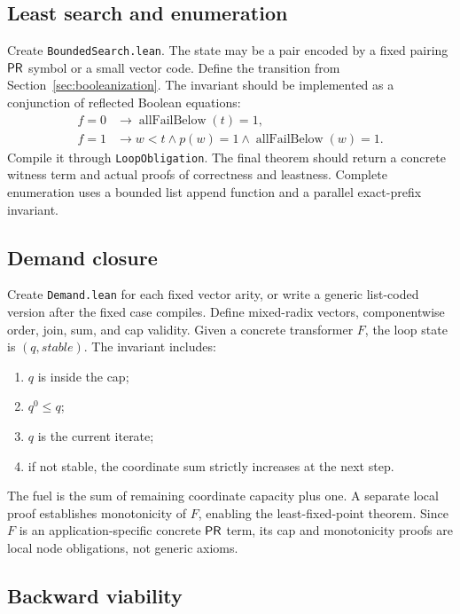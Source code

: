 \subsection{Least search and enumeration}

Create \texttt{BoundedSearch.lean}.  The state may be a pair encoded by a fixed pairing \(\mathsf{PR}\) symbol or a
small vector code.  Define the transition from Section~\ref{sec:booleanization}.  The invariant should be
implemented as a conjunction of reflected Boolean equations:
\begin{align*}
 f=0 &\to \operatorname{allFailBelow}(t)=1,\\
 f=1 &\to w<t\wedge p(w)=1\wedge\operatorname{allFailBelow}(w)=1.
\end{align*}
Compile it through \texttt{LoopObligation}.  The final theorem should return a concrete witness term and
actual proofs of correctness and leastness.  Complete enumeration uses a bounded list append function and a
parallel exact-prefix invariant.

\subsection{Demand closure}

Create \texttt{Demand.lean} for each fixed vector arity, or write a generic list-coded version after the
fixed case compiles.  Define mixed-radix vectors, componentwise order, join, sum, and cap validity.  Given a
concrete transformer \(F\), the loop state is \((q,\mathit{stable})\).  The invariant includes:
\begin{enumerate}
  \item \(q\) is inside the cap;
  \item \(q^0\le q\);
  \item \(q\) is the current iterate;
  \item if not stable, the coordinate sum strictly increases at the next step.
\end{enumerate}
The fuel is the sum of remaining coordinate capacity plus one.  A separate local proof establishes
monotonicity of \(F\), enabling the least-fixed-point theorem.  Since \(F\) is an application-specific
concrete \(\mathsf{PR}\) term, its cap and monotonicity proofs are local node obligations, not generic axioms.

\subsection{Backward viability}

